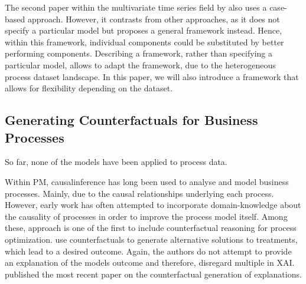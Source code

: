 \documentclass[./../../paper.tex]{subfiles}
\begin{document}
The second paper within the multivariate time series field by \citeauthor{ates_CounterfactualExplanationsMultivariate_2021} also uses a case-based approach. However, it contrasts from other approaches, as it does not specify a particular model but proposes a general framework instead. Hence, within this framework, individual components could be substituted by better performing components. Describing a framework, rather than specifying a particular model, allows to adapt the framework, due to the heterogeneous process dataset landscape. In this paper, we will also introduce a framework that allows for flexibility depending on the dataset. 

\subsection{Generating Counterfactuals for Business Processes}
So far, none of the models have been applied to process data.

Within \gls{PM}, \gls{causalinference} has long been used to analyse and model business processes. Mainly, due to the causal relationships underlying each process. However, early work has often attempted to incorporate domain-knowledge about the causality of processes in order to improve the process model itself\autocites{shook_AssessmentUseStructural_2004,baker_ClosingLoopEmpirical_2017,hompes_DiscoveringCausalFactors_2017,wang_CounterfactualDataAugmentedSequential_2021}.
Among these, \citeauthor{narendra_CounterfactualReasoningProcess_2019} approach is one of the first to include counterfactual reasoning for process optimization.
\citeauthor{oberst_CounterfactualOffPolicyEvaluation_2019} use counterfactuals to generate alternative solutions to treatments, which lead to a desired outcome.
Again, the authors do not attempt to provide an explanation of the models outcome and therefore, disregard multiple  in \gls{XAI}. \autocite{qafari_CaseLevelCounterfactual_2021} published the most recent paper on the counterfactual generation of explanations. 
\end{document}
